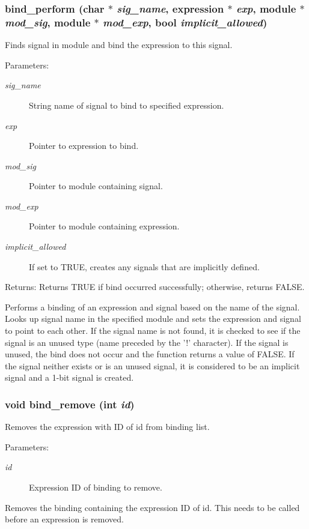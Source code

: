 \subsubsection{ bind\_\-perform (char $\ast$ {\em sig\_\-name}, {\bf expression} $\ast$ {\em exp}, {\bf module} $\ast$ {\em mod\_\-sig}, {\bf module} $\ast$ {\em mod\_\-exp}, {\bf bool} {\em implicit\_\-allowed})}\label{binding_8h_a2}


Finds signal in module and bind the expression to this signal. 

\begin{Desc}
\item[Parameters:]
\begin{description}
\item[{\em sig\_\-name}]String name of signal to bind to specified expression. \item[{\em exp}]Pointer to expression to bind. \item[{\em mod\_\-sig}]Pointer to module containing signal. \item[{\em mod\_\-exp}]Pointer to module containing expression. \item[{\em implicit\_\-allowed}]If set to TRUE, creates any signals that are implicitly defined.\end{description}
\end{Desc}
\begin{Desc}
\item[Returns:]Returns TRUE if bind occurred successfully; otherwise, returns FALSE.\end{Desc}
Performs a binding of an expression and signal based on the name of the signal. Looks up signal name in the specified module and sets the expression and signal to point to each other. If the signal name is not found, it is checked to see if the signal is an unused type (name preceded by the '!' character). If the signal is unused, the bind does not occur and the function returns a value of FALSE. If the signal neither exists or is an unused signal, it is considered to be an implicit signal and a 1-bit signal is created. 
\subsubsection{\setlength{\rightskip}{0pt plus 5cm}void bind\_\-remove (int {\em id})}\label{binding_8h_a1}


Removes the expression with ID of id from binding list. 

\begin{Desc}
\item[Parameters:]
\begin{description}
\item[{\em id}]Expression ID of binding to remove.\end{description}
\end{Desc}
Removes the binding containing the expression ID of id. This needs to be called before an expression is removed. 